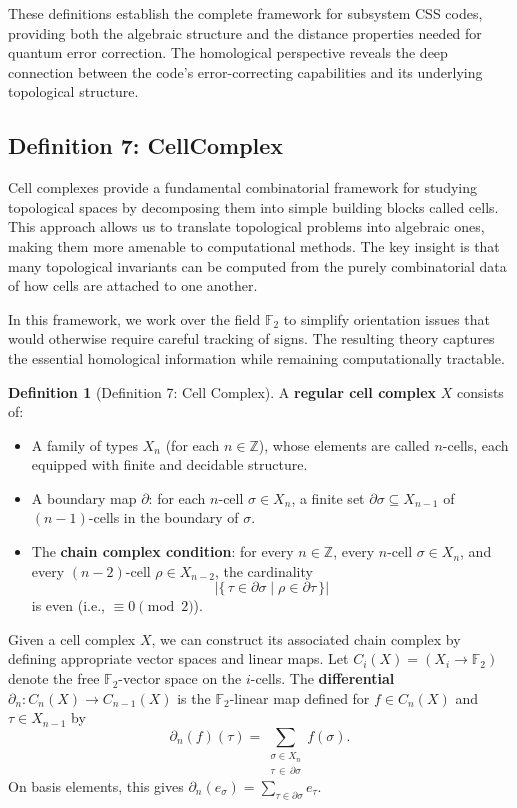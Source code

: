 \documentclass[11pt]{article}
\theoremstyle{plain}
\theoremstyle{definition}
\newtheorem*{definition}{Definition}
\theoremstyle{remark}
\begin{document}
These definitions establish the complete framework for subsystem CSS codes, providing both the algebraic structure and the distance properties needed for quantum error correction. The homological perspective reveals the deep connection between the code's error-correcting capabilities and its underlying topological structure.

\vspace{1em}

\subsection{Definition 7: CellComplex}

Cell complexes provide a fundamental combinatorial framework for studying topological spaces by decomposing them into simple building blocks called cells. This approach allows us to translate topological problems into algebraic ones, making them more amenable to computational methods. The key insight is that many topological invariants can be computed from the purely combinatorial data of how cells are attached to one another.

In this framework, we work over the field $\mathbb{F}_2$ to simplify orientation issues that would otherwise require careful tracking of signs. The resulting theory captures the essential homological information while remaining computationally tractable.

\begin{definition}[Definition 7: Cell Complex]
A \textbf{regular cell complex} $X$ consists of:
\begin{itemize}
  \item A family of types $X_n$ (for each $n \in \mathbb{Z}$), whose elements are called $n$-cells, each equipped with finite and decidable structure.
  \item A boundary map $\partial$: for each $n$-cell $\sigma \in X_n$, a finite set $\partial\sigma \subseteq X_{n-1}$ of $(n-1)$-cells in the boundary of $\sigma$.
  \item The \textbf{chain complex condition}: for every $n \in \mathbb{Z}$, every $n$-cell $\sigma \in X_n$, and every $(n-2)$-cell $\rho \in X_{n-2}$, the cardinality
  \[
    \left|\{\, \tau \in \partial\sigma \mid \rho \in \partial\tau \,\}\right|
  \]
  is even (i.e., $\equiv 0 \pmod{2}$).
\end{itemize}
\end{definition}

Given a cell complex $X$, we can construct its associated chain complex by defining appropriate vector spaces and linear maps. Let $C_i(X) = (X_i \to \mathbb{F}_2)$ denote the free $\mathbb{F}_2$-vector space on the $i$-cells. The \textbf{differential} $\partial_n : C_n(X) \to C_{n-1}(X)$ is the $\mathbb{F}_2$-linear map defined for $f \in C_n(X)$ and $\tau \in X_{n-1}$ by
\[
  \partial_n(f)(\tau) = \sum_{\substack{\sigma \in X_n \\ \tau \,\in\, \partial\sigma}} f(\sigma).
\]
On basis elements, this gives $\partial_n(e_\sigma) = \sum_{\tau \in \partial\sigma} e_\tau$.
\end{document}
